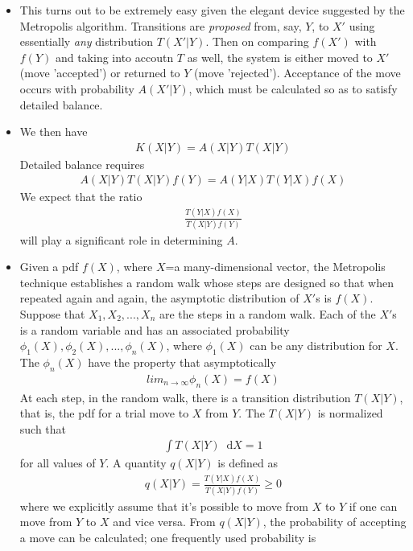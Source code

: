 \documentclass[twoside,english]{uiofysmaster}
\newcommand*\dif{\mathop{}\!\mathrm{d}}
\begin{document}
\begin{itemize}
	\item This turns out to be extremely easy given the elegant device suggested by the Metropolis algorithm. Transitions are \textit{proposed} from, say, $Y$, to $X'$ using essentially \textit{any} distribution $T(X'|Y)$. Then on comparing $f(X')$ with $f(Y)$ and taking into accoutn $T$ as well, the system is either moved to $X'$  (move 'accepted') or returned to $Y$ (move 'rejected'). Acceptance of the move occurs with probability $A(X'|Y)$, which must be calculated so as to satisfy detailed balance. 
	\item We then have
	\begin{align}
		K(X|Y) = A(X|Y) T(X|Y)
	\end{align}
	Detailed balance requires
	\begin{align}
		A(X|Y) T(X|Y) f(Y) = A(Y|X) T(Y|X) f(X)
	\end{align}
	We expect that the ratio 
	\begin{align}
		\frac{T(Y|X) f(X)}{T(X|Y) f(Y) }
	\end{align}
	will play a significant role in determining $A$.
	\item Given a pdf $f(X)$, where $X$=a many-dimensional vector, the Metropolis technique establishes a random walk whose steps are designed so that when repeated again and again, the asymptotic distribution of $X'$s is $f(X)$. Suppose that $X_1, X_2, ..., X_n$ are the steps in a random walk. Each of the $X'$s is a random variable and has an associated probability $\phi_1(X), \phi_2(X), ..., \phi_n(X)$, where $\phi_1(X)$ can be any distribution for $X$. The $\phi_n(X)$ have the property that asymptotically
	\begin{align}
		lim_{n\rightarrow \infty} \phi_n(X) = f(X)
	\end{align}
	At each step, in the random walk, there is a transition distribution $T(X|Y)$, that is, the pdf for a trial move to $X$ from $Y$. The $T(X|Y)$ is normalized such that
	\begin{align}
		\int T(X|Y) \dif X = 1
	\end{align}
	for all values of $Y$. A quantity $q(X|Y)$ is defined as 
	\begin{align}
		q(X|Y) = \frac{T(Y|X)f(X)}{T(X|Y)f(Y)} \geq 0
	\end{align}
	where we explicitly assume that it's possible to move from $X$ to $Y$ if one can move from $Y$ to $X$ and vice versa. From $q(X|Y)$, the probability of accepting a move can be calculated; one frequently used probability is
	\begin{align}

\end{align}
\end{itemize}
\end{document}
